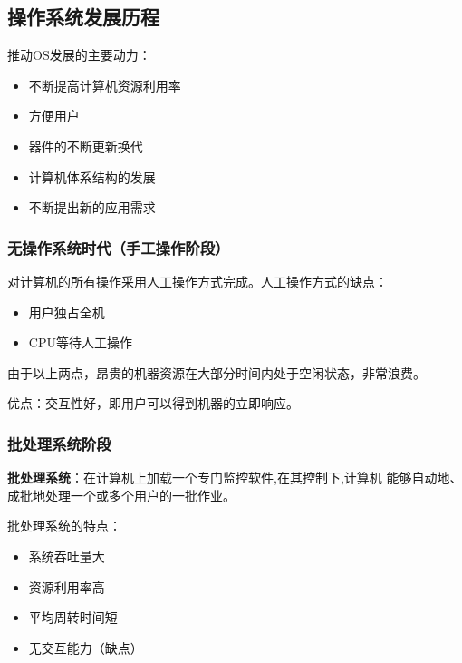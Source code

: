 \documentclass[12pt, a4paper, oneside]{ctexart}
\begin{document}
\subsection{操作系统发展历程}

推动OS发展的主要动力：
\begin{itemize}
  \item 不断提高计算机资源利用率
  \item 方便用户
  \item 器件的不断更新换代
  \item 计算机体系结构的发展
  \item 不断提出新的应用需求
\end{itemize}

\subsubsection{无操作系统时代（手工操作阶段）}

对计算机的所有操作采用人工操作方式完成。人工操作方式的缺点：
\begin{itemize}
  \item 用户独占全机
  \item CPU等待人工操作
\end{itemize}

由于以上两点，昂贵的机器资源在大部分时间内处于空闲状态，非常浪费。

优点：交互性好，即用户可以得到机器的立即响应。

\subsubsection{批处理系统阶段}

\textbf{批处理系统}：在计算机上加载一个专门监控软件,在其控制下,计算机
能够自动地、成批地处理一个或多个用户的一批作业。

批处理系统的特点：
\begin{itemize}
  \item 系统吞吐量大
  \item 资源利用率高
  \item 平均周转时间短
  \item 无交互能力（缺点）
\end{itemize}
\end{document}
